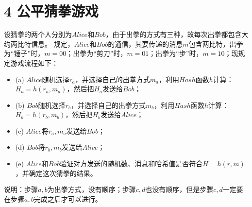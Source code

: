 \documentclass{article}
\begin{document}
\section*{4 公平猜拳游戏}
设猜拳的两个人分别为$Alice$和$Bob$，由于出拳的方式有三种，故每次出拳都包含大约两比特信息。
规定，$Alice$和$Bob$的通信，其要传递的消息$m$包含两比特，出拳为“锤子”时，$m=00$；出拳为“剪刀”时，$m=01$；出拳为“步”时，$m=10$；现规定游戏流程如下：
\begin{itemize}
\item[] (a)
	$Alice$随机选择$r_a$，并选择自己的出拳方式$m_a$，利用$Hash$函数$h$计算：$H_a=h(r_a,m_a)$，然后把$H_a$发送给$Bob$；
\item[] (b)
	$Bob$随机选择$r_b$，并选择自己的出拳方式$m_b$，利用$Hash$函数$h$计算：$H_b=h(r_b,m_b)$，然后把$H_b$发送给$Alice$；
\item[] (c)
	$Alice$将$r_a,m_a$发送给$Bob$；
\item[] (d)
	$Bob$将$r_b,m_b$发送给$Alice$；
\item[] (e)
	$Alice$和$Bob$验证对方发送的随机数、消息和哈希值是否符合$H=h(r,m)$，并确定这次猜拳的结果。
\end{itemize}
说明：步骤$a,b$为出拳方式，没有顺序；步骤$c,d$也没有顺序，但是步骤$c,d$一定要在步骤$a,b$完成之后才可以进行。
\end{document}
